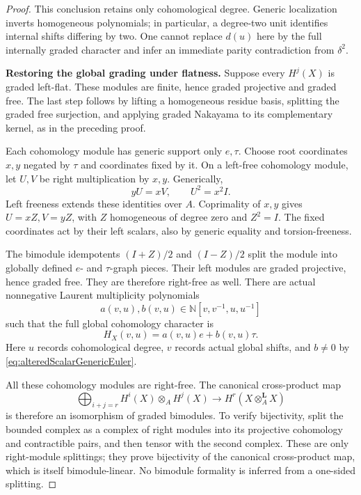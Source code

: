 \documentclass[11pt,a4paper]{article}
\theoremstyle{named}\newtheorem{finding}{Finding}[section]
\theoremstyle{definition}\newtheorem{definition}[finding]{Definition}
\theoremstyle{remark}\newtheorem{remark}[finding]{Remark}
\begin{document}
\begin{proof}
This conclusion retains only cohomological degree.
Generic localization inverts homogeneous polynomials;
in particular, a degree-two unit identifies internal
shifts differing by two. One cannot replace \(d(u)\)
here by the full internally graded character and infer
an immediate parity contradiction from \(\delta^2\).

\par\smallskip\noindent\textbf{Restoring the global grading under flatness.}\quad
Suppose every \(H^j(X)\) is graded left-flat.
These modules are finite, hence graded projective and
graded free. The last step follows by lifting a homogeneous
residue basis, splitting the graded free surjection,
and applying graded Nakayama to its complementary kernel,
as in the preceding proof.

Each cohomology module has generic support only \(e,\tau\).
Choose root coordinates \(x,y\) negated by \(\tau\)
and coordinates fixed by it. On a left-free cohomology
module, let \(U,V\) be right multiplication by \(x,y\).
Generically,
\[
                         yU=xV,\qquad U^2=x^2I.
\]
Left freeness extends these identities over \(A\).
Coprimality of \(x,y\) gives \(U=xZ,V=yZ\), with
\(Z\) homogeneous of degree zero and \(Z^2=I\).
The fixed coordinates act by their left scalars, also
by generic equality and torsion-freeness.

The bimodule idempotents \((I+Z)/2\) and \((I-Z)/2\)
split the module into globally defined \(e\)- and
\(\tau\)-graph pieces. Their left modules are graded
projective, hence graded free. They are therefore
right-free as well. There are actual nonnegative
Laurent multiplicity polynomials
\[
 a(v,u),b(v,u)\in\mathbb N[v,v^{-1},u,u^{-1}]
\]
such that the full global cohomology character is
\begin{equation}\label{eq:alteredScalarGlobalGraphs}
                       H_X(v,u)=a(v,u)e+b(v,u)\tau.
\end{equation}
Here \(u\) records cohomological degree, \(v\) records
actual global shifts, and \(b\ne0\) by
\eqref{eq:alteredScalarGenericEuler}.

All these cohomology modules are right-free. The canonical
cross-product map
\begin{equation}\label{eq:alteredScalarKunneth}
 \bigoplus_{i+j=r}H^i(X)\otimes_AH^j(X)
       \longrightarrow H^r(X\otimes_A^{\mathbf L}X)
\end{equation}
is therefore an isomorphism of graded bimodules. To verify
bijectivity, split the bounded complex as a complex of
right modules into its projective cohomology and
contractible pairs, and then tensor with the second
complex. These are only right-module splittings; they
prove bijectivity of the canonical cross-product map,
which is itself bimodule-linear. No bimodule formality
is inferred from a one-sided splitting.


\end{proof}
\end{document}
